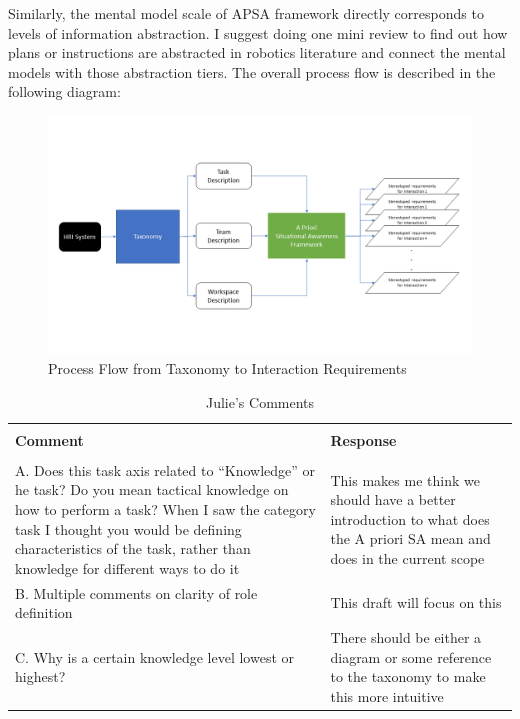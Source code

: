 \documentclass[letterpaper, 10 pt, conference]{ieeeconf} %
\begin{document}
Similarly, the mental model scale of APSA framework directly corresponds to levels of information
abstraction. I suggest doing one mini review to find out how plans or instructions are abstracted in
robotics literature and connect the mental models with those abstraction tiers. The overall process
flow is described in the following diagram:

\begin{figure}
  \includegraphics{apsa.png}
  \caption{Process Flow from Taxonomy to Interaction Requirements}
\end{figure}

\begin{table}
  \caption{Julie's Comments}
  \begin{tabular}{p{8cm} | p{8cm}}
    \hline \\
    \textbf{Comment} & \textbf{Response} \\
    \hline \\
    A. Does this task axis related to ``Knowledge'' or he task? Do you mean tactical knowledge on how to
    perform a task? When I saw the category task I thought you would be defining characteristics of
    the task, rather than knowledge for different ways to do it & This makes me think we should
                                                                  have a better introduction to what does the A priori SA mean and does in the current scope \\
    B. Multiple comments on clarity of role definition & This draft will focus on this \\
    C. Why is a certain knowledge level lowest or highest? & There should be either a diagram or some
                                                             reference to the taxonomy to make this more intuitive \\
    \hline
  \end{tabular}
\end{table}


\end{document}
